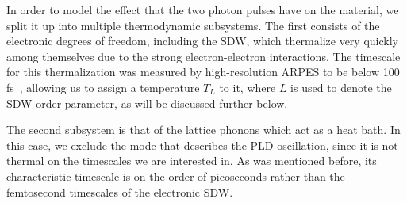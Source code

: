 In order to model the effect that the two photon pulses have on the material, we split it up into multiple thermodynamic subsystems.
The first consists of the electronic degrees of freedom, including the SDW, which thermalize very quickly among themselves due to the strong electron-electron interactions.
The timescale for this thermalization was measured by high-resolution ARPES to be below 100 fs~\cite{Nicholson2016}, allowing us to assign a temperature $T_L$ to it, where $L$ is used to denote the SDW order parameter, as will be discussed further below.

The second subsystem is that of the lattice phonons which act as a heat bath.
In this case, we exclude the mode that describes the PLD oscillation, since it is not thermal on the timescales we are interested in. As was mentioned before, its characteristic timescale is on the order of picoseconds rather than the femtosecond timescales of the electronic SDW.

